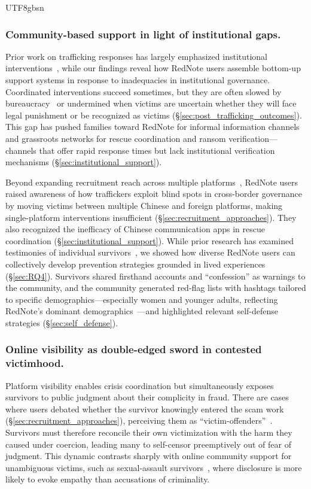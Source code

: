 \documentclass[sigconf,nonacm]{acmart}
\newcommand{\add}[1]{#1}
\begin{document}
\begin{CJK}{UTF8}{gbsn}
\add{\subsubsection{Community-based support in light of institutional gaps.}
Prior work on trafficking responses has largely emphasized institutional interventions~\cite{usip2024mekong, ohchr2023-online-scam-sea}, while our findings reveal how RedNote users assemble bottom-up support systems in response to inadequacies in institutional governance. Coordinated interventions succeed sometimes, but they are often slowed by bureaucracy~\cite{gomez2016regime} or undermined when victims are uncertain whether they will face legal punishment or be recognized as victims (\S\ref{sec:post_trafficking_outcomes}). This gap has pushed families toward RedNote for informal information channels and grassroots networks for rescue coordination and ransom verification---channels that offer rapid response times but lack institutional verification mechanisms (\S\ref{sec:institutional_support}).}

\add{Beyond expanding recruitment reach across multiple platforms~\cite{ohchr2023-online-scam-sea, lazarus2025assessing}, RedNote users raised awareness of how traffickers exploit blind spots in cross-border governance by moving victims between multiple Chinese and foreign platforms, making single-platform interventions insufficient (\S\ref{sec:recruitment_approaches}). They also recognized the inefficacy of Chinese communication apps in rescue coordination (\S\ref{sec:institutional_support}). While prior research has examined testimonies of individual survivors~\cite{lazarus2025assessing}, we showed how diverse RedNote users can collectively develop prevention strategies grounded in lived experiences (\S\ref{sec:RQ4}). Survivors shared firsthand accounts and ``confession'' as warnings to the community, and the community generated red-flag lists with hashtags tailored to specific demographics---especially women and younger adults, reflecting RedNote's dominant demographics~\cite{wan-chi25}---and highlighted relevant self-defense strategies (\S\ref{sec:self_defense}).}

\add{\subsubsection{Online visibility as double-edged sword in contested victimhood.}
Platform visibility enables crisis coordination but simultaneously exposes survivors to public judgment about their complicity in fraud. There are cases where users debated whether the survivor knowingly entered the scam work (\S\ref{sec:recruitment_approaches}), perceiving them as ``victim-offenders''~\cite{luong2024understanding, Wang2024}. Survivors must therefore reconcile their own victimization with the harm they caused under coercion, leading many to self-censor preemptively out of fear of judgment. This dynamic contrasts sharply with online community support for unambiguous victims, such as sexual-assault survivors~\cite{pevac2022online}, where disclosure is more likely to evoke empathy than accusations of criminality.}


\end{CJK}
\end{document}

